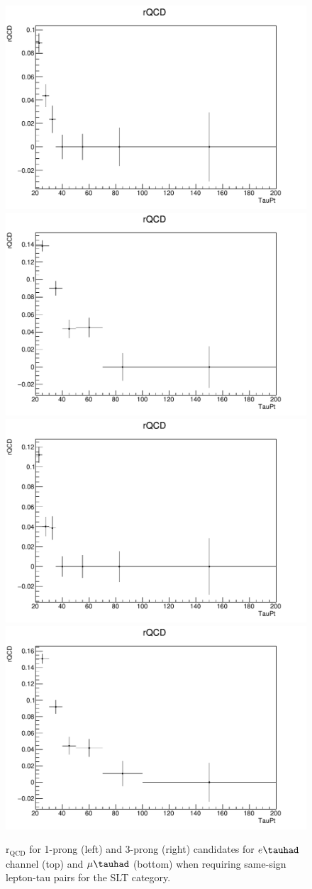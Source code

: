 \begin{figure}
\centering
\includegraphics[width=.4\textwidth]{figures/lephadFF/SLT/rQCD_All_Preselection_Np1_Elec_CR_2tag_TauPt}
\includegraphics[width=.4\textwidth]{figures/lephadFF/SLT/rQCD_All_Preselection_Np3_Elec_CR_2tag_TauPt} \\
\includegraphics[width=.4\textwidth]{figures/lephadFF/SLT/rQCD_All_Preselection_Np1_Muon_CR_2tag_TauPt}
\includegraphics[width=.4\textwidth]{figures/lephadFF/SLT/rQCD_All_Preselection_Np3_Muon_CR_2tag_TauPt}\\
\caption{$\mathrm{r}_{\mathrm{QCD}}$ for 1-prong (left) and 3-prong (right) \tauhad candidates for $e\tauhad$ channel (top) and $\mu\tauhad$ (bottom) when requiring same-sign lepton-tau pairs for the \lephad SLT category.}
\label{fig:SLT_rQCD}
\end{figure}

